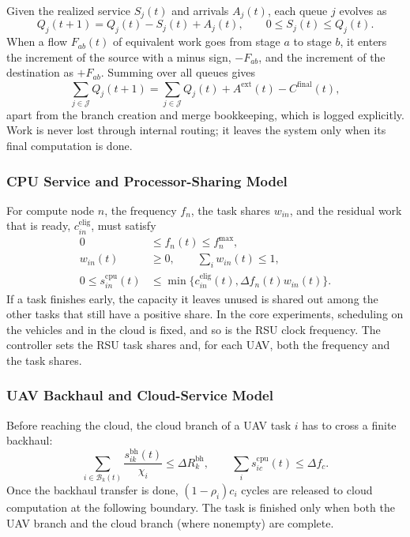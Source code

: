 Given the realized service $S_j(t)$ and arrivals $A_j(t)$, each queue $j$
evolves as
\begin{equation}
Q_j(t+1)=Q_j(t)-S_j(t)+A_j(t),\qquad
0\le S_j(t)\le Q_j(t).
\label{eq:queue}
\end{equation}
When a flow $F_{ab}(t)$ of equivalent work goes from stage $a$ to stage $b$,
it enters the increment of the source with a minus sign, $-F_{ab}$, and the
increment of the destination as $+F_{ab}$. Summing over all queues gives
\begin{equation}
\sum_{j\in\mathcal J}Q_j(t+1)=
\sum_{j\in\mathcal J}Q_j(t)+A^{\mathrm{ext}}(t)-C^{\mathrm{final}}(t),
\label{eq:conservation}
\end{equation}
apart from the branch creation and merge bookkeeping, which is logged
explicitly. Work is never lost through internal routing; it leaves the
system only when its final computation is done.

\subsubsection{CPU Service and Processor-Sharing Model}
For compute node $n$, the frequency $f_n$, the task shares $w_{in}$, and the
residual work that is ready, $c_{in}^{\mathrm{elig}}$, must satisfy
\begin{equation}
\begin{aligned}
0&\le f_n(t)\le f_n^{\max},\\
w_{in}(t)&\ge0,\qquad \sum_iw_{in}(t)\le1,\\
0\le s_{in}^{\mathrm{cpu}}(t)&\le
\min\{c_{in}^{\mathrm{elig}}(t),\Delta f_n(t)w_{in}(t)\}.
\end{aligned}
\label{eq:cpu_capacity}
\end{equation}
If a task finishes early, the capacity it leaves unused is shared out among
the other tasks that still have a positive share. In the core experiments,
scheduling on the vehicles and in the cloud is fixed, and so is the RSU clock
frequency. The controller sets the RSU task shares and, for each UAV, both the
frequency and the task shares.

\subsubsection{UAV Backhaul and Cloud-Service Model}
Before reaching the cloud, the cloud branch of a UAV task $i$ has to cross a
finite backhaul:
\begin{equation}
\sum_{i\in\mathcal B_k(t)}
\frac{s_{ik}^{\mathrm{bh}}(t)}{\chi_i}
\le\Delta R_k^{\mathrm{bh}},
\qquad
\sum_i s_{ic}^{\mathrm{cpu}}(t)\le\Delta f_c.
\label{eq:cloud_capacity}
\end{equation}
Once the backhaul transfer is done, $(1-\rho_i)c_i$ cycles are released to
cloud computation at the following boundary. The task is finished only when
both the UAV branch and the cloud branch (where nonempty) are complete.

